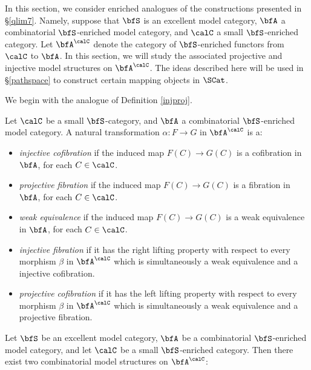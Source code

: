 \begin{Simplicial Categories}
In this section, we consider enriched analogues of the constructions presented in
\S \ref{qlim7}. Namely, suppose that $\bfS$ is an excellent model category,
$\bfA$ a combinatorial $\bfS$-enriched model category, and $\calC$ a small
$\bfS$-enriched category. Let $\bfA^{\calC}$ denote the category of
$\bfS$-enriched functors from $\calC$ to $\bfA$. In this section, we will study the associated
projective and injective model structures on $\bfA^{\calC}$. The ideas described here will be used in \S \ref{pathspace} to construct certain mapping objects in $\SCat$.

We begin with the analogue of Definition \ref{injproj}.

\begin{definition}\label{projinj}
Let $\calC$ be a small $\bfS$-category, and $\bfA$ a combinatorial $\bfS$-enriched model category.
A natural transformation $\alpha: F \rightarrow G$ in $\bfA^{\calC}$ is a:

\begin{itemize}
\item {\it injective cofibration} if the induced map $F(C) \rightarrow
G(C)$ is a cofibration in $\bfA$, for each $C \in \calC$.

\item {\it projective fibration} if the induced map $F(C) \rightarrow
G(C)$ is a fibration in $\bfA$, for each $C \in \calC$.

\item {\it weak equivalence} if the induced map $F(C) \rightarrow
G(C)$ is a weak equivalence in $\bfA$, for each $C \in \calC$.

\item {\it injective fibration} if it has the right lifting property
with respect to every morphism $\beta$ in $\bfA^{\calC}$ which is
simultaneously a weak equivalence and a injective cofibration.

\item {\it projective cofibration} if it has the left lifting property
with respect to every morphism $\beta$ in $\bfA^{\calC}$ which is
simultaneously a weak equivalence and a projective fibration.
\end{itemize}
\end{definition}

\begin{proposition}\label{smurf}
Let $\bfS$ be an excellent model category, $\bfA$ be a combinatorial $\bfS$-enriched model category, and let $\calC$ be a small $\bfS$-enriched category. Then there exist two combinatorial model structures on $\bfA^{\calC}$:


\end{proposition}
\end{Simplicial Categories}
